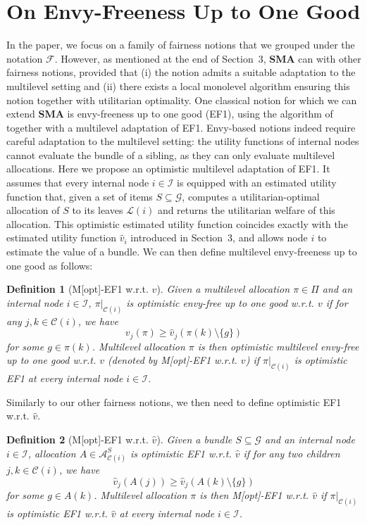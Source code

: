 \documentclass[]{article}
\newtheorem{definition}{Definition}
\newcommand{\items}{\mathcal{G}}
\newcommand{\children}{\mathcal{C}}
\newcommand{\leaves}{\mathcal{L}}
\newcommand{\internal}{\mathcal{I}}
\newcommand{\fair}{\mathcal{F}}
\newcommand{\allocations}{\mathcal{A}}
\begin{document}
\section{On Envy-Freeness Up to One Good} \label{appendix: on EF1}

In the paper, we focus on a family of fairness notions that we grouped under the notation $\fair$. However, as mentioned at the end of Section~3, \textbf{SMA} can with other fairness notions, provided that (i) the notion admits a suitable adaptation to the multilevel setting and (ii) there exists a local monolevel algorithm ensuring this notion together with utilitarian optimality. One classical notion for which we can extend \textbf{SMA} is envy-freeness up to one good (EF1), using the algorithm of \cite{Benabbou_et_al2021} together with a multilevel adaptation of EF1. 
Envy-based notions indeed require careful adaptation to the multilevel setting: the utility functions of internal nodes cannot evaluate the bundle of a sibling, as they can only evaluate multilevel allocations. Here we propose an optimistic multilevel adaptation of EF1. It assumes that every internal node $i \in \internal$ is equipped with an estimated utility function that, given a set of items $S \subseteq \items$, computes a utilitarian-optimal allocation of $S$ to its leaves $\leaves(i)$ and returns the utilitarian welfare of this allocation. This optimistic estimated utility function coincides exactly with the estimated utility function $\hat{v}_i$ introduced in Section~3, and allows node $i$ to estimate the value of a bundle. We can then define multilevel envy-freeness up to one good as follows:

\begin{definition}[M{[opt]}-EF1 w.r.t. $v$]
    Given a multilevel allocation $\pi \in \Pi$ and an internal node $i \in \internal$, $\pi \vert_{\children(i)}$ is optimistic envy-free up to one good w.r.t. $v$ if for any $j, k \in \children(i)$, we have
    $$v_j(\pi) \geq \hat{v}_j(\pi(k) \setminus \{g\})$$ for some $g \in \pi(k)$. Multilevel allocation $\pi$ is then optimistic multilevel envy-free up to one good w.r.t. $v$ (denoted by M[opt]-EF1 w.r.t. $v$) if $\pi \vert_{\children(i)}$ is optimistic EF1 at every internal node $i \in \internal$.
\end{definition} 

Similarly to our other fairness notions, we then need to define optimistic EF1 w.r.t. $\hat{v}$. 

\begin{definition}[M{[opt]}-EF1 w.r.t. $\hat{v}$]
    Given a bundle $S \subseteq \items$ and an internal node $i \in \internal$, allocation $A \in \allocations^S_{\children(i)}$ is optimistic EF1 w.r.t. $\hat{v}$ if for any two children $j, k \in \children(i)$, we have 
    $$\hat{v}_j(A(j)) \geq \hat{v}_j(A(k) \setminus \{g\})$$ for some $g \in A(k)$. Multilevel allocation $\pi$ is then M[opt]-EF1 w.r.t. $\hat{v}$ if $\pi \vert_{\children(i)}$ is optimistic EF1 w.r.t. $\hat{v}$ at every internal node $i \in \internal$.
\end{definition}
\end{document}
